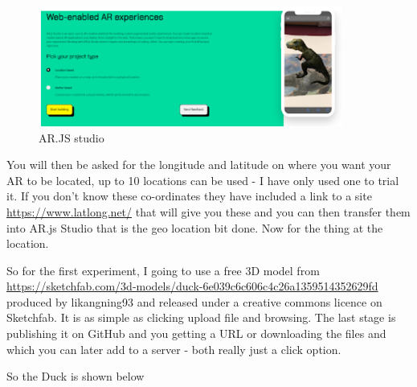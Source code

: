\begin{figure}
    \centering
    \includegraphics[width=10cm]{chapters/ChapterAR/webar1.png}
    \caption{AR.JS studio}
    \label{fig:arjsstudio}
\end{figure}
 
 You will then be asked for the longitude and latitude on where you want your AR to be located, up to 10 locations can be used - I have only used one to trial it. If you don't know these co-ordinates they have included a link to a site \url{https://www.latlong.net/}  that will give you these and you can then transfer them into AR.js Studio that is the geo location bit done. Now for the thing at the location.
 
 
So for the first experiment, I going to use a free 3D model from \url{https://sketchfab.com/3d-models/duck-6e039c6c606c4c26a1359514352629fd}  produced by likangning93 and released under a creative commons licence on Sketchfab. It is as simple as clicking upload file and browsing. The last stage is publishing it on GitHub and you getting a URL or downloading the files and which you can later add to a server - both really just a click option. 

So the Duck is shown below 

